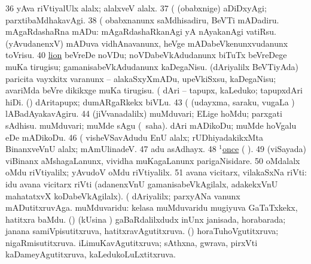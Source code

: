 \num{36}  yAva riVtiyalUlx alalx; alalxveV alalx. 
\num{37}  (  (obabxnige) aDiDxyAgi; parxtibaMdhakavAgi. 
\num{38}  (  obabxnanunx saMdhisadiru, BeVTi mADadiru. 
  mAgaRdashaRna mADu: 
\banum
{} mAgaRdashaRkanAgi yA nAyakanAgi vatiRsu. 
 (yAvudanenxV) mADuva vidhAnavanunx, heVge mADabeVkenunxvudanunx toVrisu. 
\eanum
\numie
\num{40} \hyperref{kandict_l.pdf}{L}{lion nuga(3)}{lion}  
  
\banum
{} beVreDe noVDu; noVDabeVkAdudanunx biTuTx beVreDege muKa tirugisu; gamanisabeVkAdudanunx kaDegaNisu. 
 (dAriyalilx BeVTiyAda) paricita vayxkitx \mo varanunx -- alakaSxyXmADu, upeVkiSxsu, kaDegaNisu; avariMda beVre dikikxge muKa tirugisu. 
\eanum
\numie
{}  (  
\banum
{} dAri -- tapupx, kaLeduko; tapupxdAri hiDi. 
 (\rUpa) dAritapupx; dumARgaRkekx biVLu. 
\eanum
\numie
\num{43}  (  (udayxma, saraku, \mo vugaLa \vi) lABadAyakavAgiru. 
\num{44}  (jiVvanadalilx) muMduvari; ELige hoMdu; parxgati sAdhisu. 
  
\banum
{} muMduvari; muMde sAgu (\rUpa\ saha). 
 dAri mADikoDu; muMde hoVgalu eDe mADikoDu. 
\eanum
\numie
\num{46}  (  visheVSavAdudu EnU alalx; rUDhiyadakikxMta BinanxveVnU alalx; mAmUlinadeV. 
\num{47}  adu asAdhayx. 
\num{48} \hyperref{kandict_o.pdf}{O}{once(1) pagu(3)}{$^1$once}  ( ). 
\num{49}  (viSayada) viBinanx aMshagaLanunx, vividha muKagaLanunx parigaNisidare. 
\num{50}  oMdalalx oMdu riVtiyalilx; yAvudoV oMdu riVtiyalilx. 
\num{51}  avana vicitarx, vilakaSxNa riVti:  idu avana vicitarx riVti (adanenxVnU gamanisabeVkAgilalx, adakekxVnU mahatatxvX koDabeVkAgilalx). 
  (  
\banum
{} dAriyalilx; parxyANa \mo vanunx mADutitxruvAga. 
 muMduvaridu: kelasa muMduvaridu mugiyuva GaTaTxkekx, hatitxra baMdu. 
 (\AmA) (kUsina \vi) gaBaRdalilxdudx inUnx janisada, horabarada; janana samiVpisutitxruva, hatitxravAgutitxruva. 
\eanum
\numie
{}  (\AmA) 
\banum
{} horaTuhoVgutitxruva; nigaRmisutitxruva. 
 iLimuKavAgutitxruva; sAthxna, gwrava, pirxVti kaDameyAgutitxruva, kaLedukoLuLxtitxruva. 

